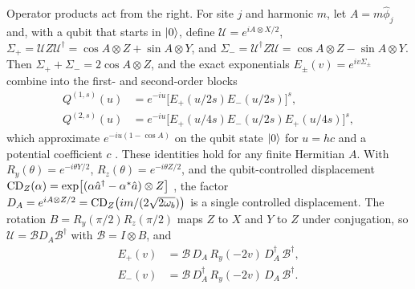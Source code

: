 \documentclass[pra,twocolumn,superscriptaddress,nofootinbib,floatfix]{revtex4-2}
\theoremstyle{remark}
\newcommand{\revcolor}{\color{blue}}
\DeclareRobustCommand{\rev}[1]{{\revcolor #1}}
\begin{document}
\rev{Operator products act from the right.} \rev{For site \(j\) and harmonic \(m\), let \(A=m\hat\phi_j\) and, with a qubit that starts in \(\ket0\), define \(\mathcal U=e^{iA\otimes X/2}\), \(\Sigma_+=\mathcal UZ\mathcal U^\dagger=\cos A\otimes Z+\sin A\otimes Y\), and \(\Sigma_-=\mathcal U^\dagger Z\mathcal U=\cos A\otimes Z-\sin A\otimes Y\).} \rev{Then \(\Sigma_++\Sigma_-=2\cos A\otimes Z\), and the exact exponentials \(E_\pm(v)=e^{iv\Sigma_\pm}\) combine into the first- and second-order blocks}
\begingroup\revcolor
\begin{align}
Q^{(1,s)}(u)&=e^{-iu}\big[E_+(u/2s)E_-(u/2s)\big]^s,\nonumber\\
Q^{(2,s)}(u)&=e^{-iu}\big[E_+(u/4s)E_-(u/2s)E_+(u/4s)\big]^s,
\end{align}
\endgroup
\rev{which approximate \(e^{-iu(1-\cos A)}\) on the qubit state \(\ket0\) for \(u=hc\) and a potential coefficient \(c\) \cite{Rainaldi2026TrigonometricCV}.} \rev{These identities hold for any finite Hermitian \(A\).} \rev{With \(R_y(\theta)=e^{-i\theta Y/2}\), \(R_z(\theta)=e^{-i\theta Z/2}\), and the qubit-controlled displacement \({\rm CD}_Z(\alpha)=\exp[(\alpha\hat a^\dagger-\alpha^*\hat a)\otimes Z]\) \cite{Eickbusch2022ECD}, the factor \(D_A=e^{iA\otimes Z/2}={\rm CD}_Z\bigl(im/(2\sqrt{2\omega_b})\bigr)\) is a single controlled displacement.} \rev{The rotation \(B=R_y(\pi/2)R_z(\pi/2)\) maps \(Z\) to \(X\) and \(Y\) to \(Z\) under conjugation, so \(\mathcal U=\mathcal BD_A\mathcal B^\dagger\) with \(\mathcal B=I\otimes B\), and}
\begingroup\revcolor
\begin{align}
E_+(v)&=\mathcal B\,D_A\,R_y(-2v)\,D_A^\dagger\,\mathcal B^\dagger,\nonumber\\
E_-(v)&=\mathcal B\,D_A^\dagger\,R_y(-2v)\,D_A\,\mathcal B^\dagger .
\end{align}
\endgroup
\end{document}
